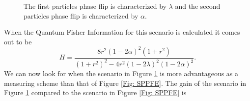 \documentclass[twocolumn]{article}
\begin{document}
\begin{figure}[ht]
    \caption{\footnotesize{The first particles phase flip is characterized by $\lambda$ and the second particles phase flip is characterized by $\alpha$.}}
    \label{Fig: DCPFAL} 
\end{figure}
\par \noindent
When the Quantum Fisher Information for this scenario is calculated it comes out to be
\begin{equation}\label{Eq: DCPFALQFI} 
H=\frac{8r^2(1-2\alpha)^2(1+r^2)}{(1+r^2)^2-4r^2(1-2\lambda)^2(1-2\alpha)^2}.
\end{equation}
We can now look for when the scenario in Figure \ref{Fig: DCPFAL} is more advantageous as a measuring scheme than that of Figure \ref{Fig: SPPFE}. The gain of the scenario in Figure \ref{Fig: DCPFAL} compared to the scenario in Figure \ref{Fig: SPPFE} is
\end{document}
